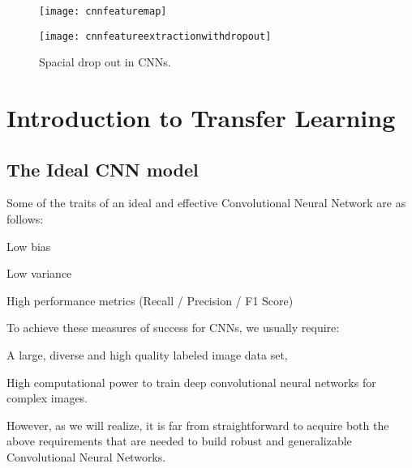 	\begin{figure}[tbh]
		\centering
		\begin{minipage}{\textwidth}
		\centering
		\texttt{[image: cnnfeaturemap]}
		\end{minipage}
		\begin{minipage}{\textwidth}
		\centering
		\texttt{[image: cnnfeatureextractionwithdropout]}
		\end{minipage}
		\caption[Spacial drop out in CNNs]{Spacial drop out in CNNs.}
		\label{fig:covarianceshift}
	\end{figure}

	\section{Introduction to Transfer Learning}
	\subsection{The Ideal CNN model}
	\begin{bulletedlist}
		\item Some of the traits of an ideal and effective Convolutional Neural Network are as follows:
		\begin{bulletedlist}
			\item Low bias
			\item Low variance
			\item High performance metrics (Recall / Precision / F1 Score)
		\end{bulletedlist}
		\item To achieve these measures of success for CNNs, we usually require:
		\begin{bulletedlist}
			\item A large, diverse and high quality labeled image data set,
			\item High computational power to train deep convolutional neural networks for complex images.
		\end{bulletedlist}
		\item However, as we will realize, it is far from straightforward to acquire both the above requirements that are needed to build robust and generalizable Convolutional Neural Networks.
	\end{bulletedlist}

